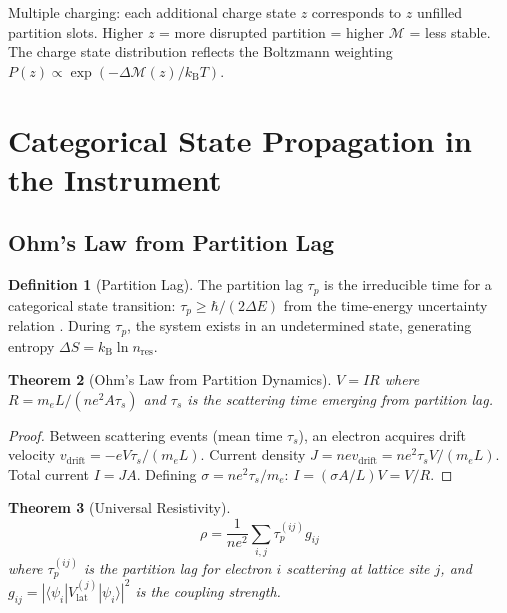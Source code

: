 \documentclass[11pt,twocolumn,a4paper]{article}
\newtheorem{theorem}{Theorem}[section]
\theoremstyle{definition}
\newtheorem{definition}[theorem]{Definition}
\theoremstyle{remark}
\newcommand{\kB}{k_{\mathrm{B}}}
\newcommand{\Depth}{\mathcal{M}}
\newcommand{\taup}{\tau_p}
\begin{document}
Multiple charging: each additional charge state $z$ corresponds to $z$ unfilled partition slots. Higher $z$ = more disrupted partition = higher $\Depth$ = less stable. The charge state distribution reflects the Boltzmann weighting $P(z) \propto \exp(-\Delta\Depth(z)/\kB T)$.

\section{Categorical State Propagation in the Instrument}
\label{sec:transport}

\subsection{Ohm's Law from Partition Lag}

\begin{definition}[Partition Lag]
The partition lag $\taup$ is the irreducible time for a categorical state transition: $\taup \geq \hbar/(2\Delta E)$ from the time-energy uncertainty relation \citep{mandelstam1991, heisenberg1927}. During $\taup$, the system exists in an undetermined state, generating entropy $\Delta S = \kB \ln n_{\mathrm{res}}$.
\end{definition}

\begin{theorem}[Ohm's Law from Partition Dynamics]
\label{thm:ohm}
$V = IR$ where $R = m_e L/(ne^2 A \tau_s)$ and $\tau_s$ is the scattering time emerging from partition lag.
\end{theorem}

\begin{proof}
Between scattering events (mean time $\tau_s$), an electron acquires drift velocity $v_{\mathrm{drift}} = -eV\tau_s/(m_e L)$. Current density $J = nev_{\mathrm{drift}} = ne^2\tau_s V/(m_e L)$. Total current $I = JA$. Defining $\sigma = ne^2\tau_s/m_e$: $I = (\sigma A/L)V = V/R$.
\end{proof}

\begin{theorem}[Universal Resistivity]
\label{thm:resistivity}
\begin{equation}
\rho = \frac{1}{ne^2}\sum_{i,j}\taup^{(ij)} g_{ij}
\end{equation}
where $\taup^{(ij)}$ is the partition lag for electron $i$ scattering at lattice site $j$, and $g_{ij} = |\langle\psi_i|V_{\mathrm{lat}}^{(j)}|\psi_i\rangle|^2$ is the coupling strength.
\end{theorem}
\end{document}
